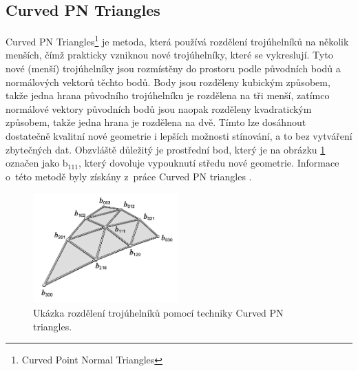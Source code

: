 \subsection*{Curved PN Triangles}
 Curved PN Triangles\footnote{Curved Point Normal Triangles} je metoda,  která používá rozdělení trojúhelníků na několik menších, čímž prakticky vzniknou nové trojúhelníky, které se vykreslují.
 Tyto nové (menší) trojúhelníky jsou rozmístěny do prostoru podle původních bodů a normálových vektorů těchto bodů. Body jsou rozděleny kubickým způsobem, takže jedna hrana původního trojúhelníku je rozdělena na tři menší, zatímco normálové vektory původních bodů jsou naopak rozděleny kvadratickým způsobem, takže jedna hrana je rozdělena na dvě. Tímto lze dosáhnout dostatečně kvalitní nové geometrie i lepších možnosti stínování, a to bez vytváření zbytečných dat. Obzvláště důležitý je prostřední bod, který je na obrázku \ref{pn_triangle} označen jako b$_{111}$, který dovoluje vypouknutí středu nové geometrie. Informace o~této metodě byly získány z~práce Curved PN triangles \cite{vlachos}.


\begin{figure}[H]
	\centering
	\includegraphics[width=15em]{images/pn/Curved-PN-triangle-tessellation-in-the-graphics-pipeline.png}
	\caption[caption]{Ukázka rozdělení trojúhelníků pomocí techniky Curved PN triangles.\footnotemark }
	\label{pn_triangle}
\end{figure}

